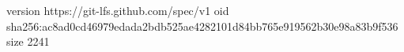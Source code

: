 version https://git-lfs.github.com/spec/v1
oid sha256:ac8ad0cd46979edada2bdb525ae4282101d84bb765e919562b30e98a83b9f536
size 2241

